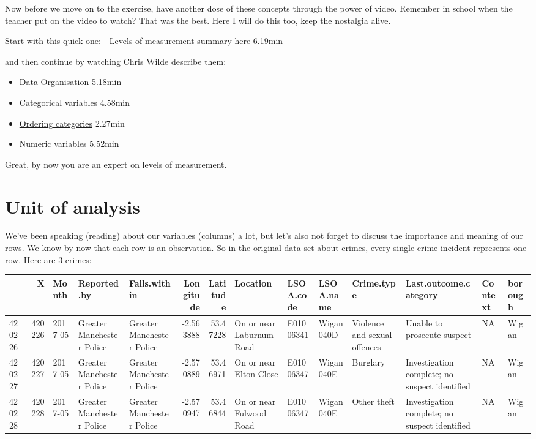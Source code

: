 \documentclass[]{book}
\providecommand{\tightlist}{%
  \setlength{\itemsep}{0pt}\setlength{\parskip}{0pt}}
\theoremstyle{definition}
\theoremstyle{definition}
\theoremstyle{definition}
\theoremstyle{remark}
\begin{document}
Now before we move on to the exercise, have another dose of these
concepts through the power of video. Remember in school when the teacher
put on the video to watch? That was the best. Here I will do this too,
keep the nostalgia alive.

Start with this quick one: -
\href{https://www.youtube.com/watch?v=hZxnzfnt5v8}{Levels of measurement
summary here} 6.19min

and then continue by watching Chris Wilde describe them:

\begin{itemize}
\tightlist
\item
  \href{https://www.youtube.com/watch?v=_ROBwTFVldo\&list=PL8CRAVedURQpYNoFt7w6maxaQCn3ZLytu\&index=3}{Data
  Organisation} 5.18min
\item
  \href{https://www.youtube.com/watch?v=38oQwFeCEag\&list=PL8CRAVedURQrlxeFfme0TEgaj1_h67JUR\&index=2}{Categorical
  variables} 4.58min
\item
  \href{https://www.youtube.com/watch?v=xmRuRRHsUeg\&index=3\&list=PL8CRAVedURQrlxeFfme0TEgaj1_h67JUR}{Ordering
  categories} 2.27min
\item
  \href{https://www.youtube.com/watch?v=U3lk2nQYfAQ\&list=PL8CRAVedURQrlxeFfme0TEgaj1_h67JUR\&index=4}{Numeric
  variables} 5.52min
\end{itemize}

Great, by now you are an expert on levels of measurement.

\hypertarget{unit-of-analysis}{%
\section{Unit of analysis}\label{unit-of-analysis}}

We've been speaking (reading) about our variables (columns) a lot, but
let's also not forget to discuss the importance and meaning of our rows.
We know by now that each row is an observation. So in the original data
set about crimes, every single crime incident represents one row. Here
are 3 crimes:

\begin{tabular}{l|r|l|l|l|r|r|l|l|l|l|l|l|l}
\hline
  & X & Month & Reported.by & Falls.within & Longitude & Latitude & Location & LSOA.code & LSOA.name & Crime.type & Last.outcome.category & Context & borough\\
\hline
420226 & 420226 & 2017-05 & Greater Manchester Police & Greater Manchester Police & -2.563888 & 53.47228 & On or near Laburnum Road & E01006341 & Wigan 040D & Violence and sexual offences & Unable to prosecute suspect & NA & Wigan\\
\hline
420227 & 420227 & 2017-05 & Greater Manchester Police & Greater Manchester Police & -2.570889 & 53.46971 & On or near Elton Close & E01006347 & Wigan 040E & Burglary & Investigation complete; no suspect identified & NA & Wigan\\
\hline
420228 & 420228 & 2017-05 & Greater Manchester Police & Greater Manchester Police & -2.570947 & 53.46844 & On or near Fulwood Road & E01006347 & Wigan 040E & Other theft & Investigation complete; no suspect identified & NA & Wigan\\
\hline
\end{tabular}
\end{document}
